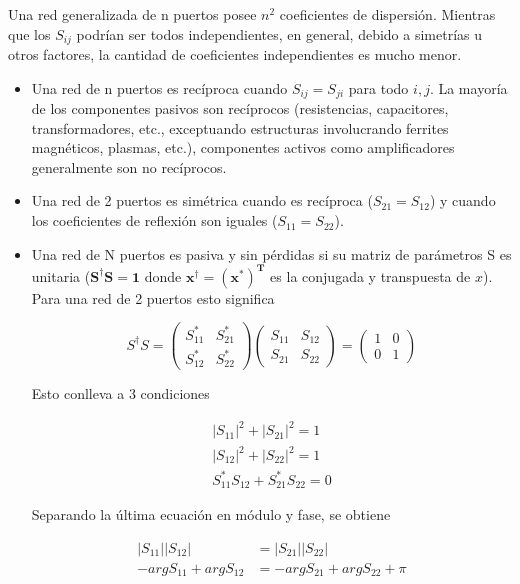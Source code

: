 Una red generalizada de n puertos posee $n^2$ coeficientes de dispersión. Mientras que los $S_{ij}$ podrían ser todos independientes,
en general, debido a simetrías u otros factores, la cantidad de coeficientes independientes es mucho menor.
\begin{itemize}
	\item Una red de n puertos es recíproca cuando $S_{ij} = S_{ji}$ para todo $i, j$. La mayoría de los componentes pasivos son
		recíprocos (resistencias, capacitores, transformadores, etc., exceptuando estructuras involucrando ferrites magnéticos,
		plasmas, etc.), componentes activos como amplificadores generalmente son no recíprocos.
	\item Una red de 2 puertos es simétrica cuando es recíproca ($S_{21} = S_{12}$) y cuando los coeficientes de reflexión son iguales
		($S_{11} = S_{22}$).
	\item Una red de N puertos es pasiva y sin pérdidas si su matriz de parámetros S es unitaria ($\mathbf{S^{\dagger}S = 1}$ donde
		$\mathbf{x^{\dagger} = (x^*)^T}$ es la conjugada y transpuesta de $x$). Para una red de 2 puertos esto significa

\begin{equation}
S^{\dagger}S = \begin{pmatrix} S_{11}^* & S_{21}^*\\S_{12}^* & S_{22}^* \end{pmatrix}
			\begin{pmatrix} S_{11} & S_{12}\\S_{21} & S_{22} \end{pmatrix} = \begin{pmatrix} 1 & 0\\0 & 1 \end{pmatrix}
\end{equation}

Esto conlleva a 3 condiciones

\begin{equation}
\begin{aligned}
	|S_{11}|^2 + |S_{21}|^2 = 1 \\
	|S_{12}|^2 + |S_{22}|^2 = 1 \\
	S_{11}^*S_{12} + S_{21}^*S_{22} = 0
\end{aligned}
\label{eq:sCondition}
\end{equation}

Separando la última ecuación en módulo y fase, se obtiene

\begin{equation}
\begin{aligned}
	|S_{11}||S_{12}| &= |S_{21}||S_{22}| \\
	-argS_{11} + argS_{12} &= -argS_{21} + argS_{22} + \pi
\end{aligned}
\label{eq:con}
\end{equation}


\end{itemize}
